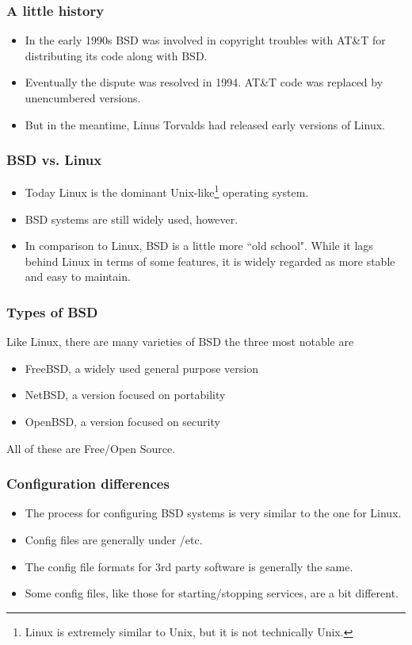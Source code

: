 \documentclass[10pt]{beamer}
\begin{document}
\begin{frame}
  \frametitle{A little history}
  \begin{itemize}
    \item In the early 1990s BSD was involved in copyright troubles with
          AT\&T for distributing its code along with BSD.
    \item Eventually the dispute was resolved in 1994.  AT\&T code was
          replaced by unencumbered versions.
    \item But in the meantime, Linus Torvalds had released early versions
          of Linux.
  \end{itemize}  
\end{frame}


\begin{frame}
  \frametitle{BSD vs. Linux}
  \begin{itemize}
    \item Today Linux is the dominant Unix-like\footnote{Linux is extremely similar to Unix, but it is not technically Unix.} operating system.
    \item BSD systems are still widely used, however.
    \item In comparison to Linux, BSD is a little more ``old school".  While
          it lags behind Linux in terms of some features, it is widely 
          regarded as more stable and easy to maintain.
  \end{itemize}  
\end{frame}


\begin{frame}
  \frametitle{Types of BSD}
  Like Linux, there are many varieties of BSD the three most notable are
  \begin{itemize}
    \item FreeBSD, a widely used general purpose version
    \item NetBSD, a version focused on portability
    \item OpenBSD, a version focused on security
  \end{itemize}  

  All of these are Free/Open Source.
\end{frame}


\begin{frame}
  \frametitle{Configuration differences}
  \begin{itemize}
    \item The process for configuring BSD systems is very similar
          to the one for Linux.
    \item Config files are generally under /etc.
    \item The config file formats for 3rd party software is generally the same.
    \item Some config files, like those for starting/stopping services, are
          a bit different.
  \end{itemize}  
\end{frame}
\end{document}
